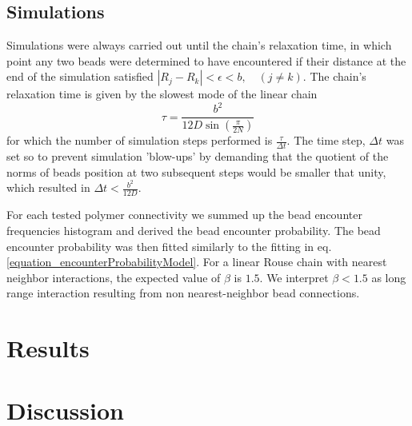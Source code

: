 \documentclass[12pt]{paper}
\begin{document}
\subsection{Simulations}\label{subsection_simulations}
Simulations were always carried out until the chain's relaxation time, in which point any two beads were determined to have encountered if their distance at the end of the simulation satisfied $|R_j-R_k|<\epsilon<b,\quad  (j\ne k)$. 
The chain's relaxation time is given by the slowest mode of the linear chain 
\begin{equation*}
\tau =\frac{b^2}{12D\sin(\frac{\pi}{2N})} 
\end{equation*}  
for which the number of simulation steps performed is $\frac{\tau}{\Delta t} $. The time step, $\Delta t$ was set so to prevent simulation 'blow-ups' by demanding that the quotient of the norms of beads position at two subsequent steps would be smaller that unity, which resulted in $\Delta t < \frac{b^2}{12D}$. 

For each tested polymer connectivity we summed up the bead encounter frequencies histogram and derived the bead encounter probability. The bead encounter probability was then fitted similarly to the fitting in eq. \ref{equation_encounterProbabilityModel}. For a linear Rouse chain with nearest neighbor interactions, the expected value of $\beta$ is $1.5$. We interpret $\beta<1.5$ as long range interaction resulting from non nearest-neighbor bead connections.
 







\section{Results}\label{section_results}
%



\section{Discussion}\label{section_discussion}

\end{document}
